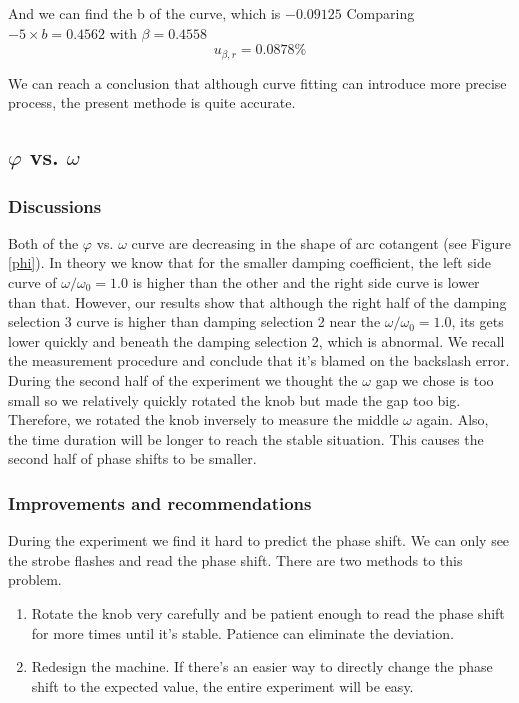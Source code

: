 And we can find the b of the curve, which is $-0.09125$
Comparing $- 5\times b =  0.4562 $ with $\beta = 0.4558$
$$ u_{\beta,r}=  0.0878 \% $$

We can reach a conclusion that although curve fitting can introduce more precise
process, the present methode is quite accurate.


\subsection{$\varphi$ vs. $\omega$}

\subsubsection{Discussions}

Both of the $\varphi$ vs. $\omega$ curve are decreasing in the shape of arc
cotangent (see Figure \ref{phi}). In theory we know that for the smaller damping
coefficient, the left side curve of $\omega/\omega_0=1.0$ is higher than the
other and the right side curve is lower than that. However, our results show
that although the right half of the damping selection 3 curve is higher than
damping selection 2 near the $\omega/\omega_0=1.0$, its gets lower quickly and
beneath the damping selection 2, which is abnormal. We recall the measurement
procedure and conclude that it's blamed on the backslash error. During the
second half of the experiment we thought the $\omega$ gap we chose is too small
so we relatively quickly rotated the knob but made the gap too big. Therefore,
we rotated the knob inversely to measure the middle $\omega$ again. Also, the
time duration will be longer to reach the stable situation. This causes the
second half of phase shifts to be smaller. 

\subsubsection{Improvements and recommendations}

During the experiment we find it hard to predict the phase shift. We can only
see the strobe flashes and read the phase shift. There are two methods to this
problem. 

\begin{enumerate}
\item Rotate the knob very carefully and be patient enough to read the phase
  shift for more times until it's stable. Patience can eliminate the deviation. 
\item Redesign the machine. If there's an easier way to directly change the
  phase shift to the expected value, the entire experiment will be easy. 
\end{enumerate}

